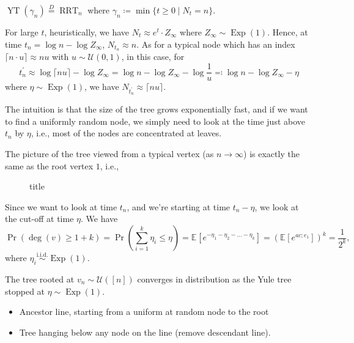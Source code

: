 \begin{lemma}
	\(\operatorname{YT}(\gamma _n) \overset{D}{=} \operatorname{RRT}_n \) where \(\gamma _n \coloneqq \min \{ t \geq 0 \mid N_t = n \} \).
\end{lemma}

For large \(t\), heuristically, we have \(N_t \approx e^t \cdot Z_{\infty } \) where \(Z_{\infty } \sim \operatorname{Exp}(1) \). Hence, at time \(t_n = \log n - \log Z_{\infty }\), \(N_{t_n} \approx n\). As for a typical node which has an index \(\lceil n \cdot u \rceil \approx n u\) with \(u \sim \mathcal{U} (0, 1)\), in this case, for
\[
	t^{\prime} _n
	\approx \log \lceil n u \rceil - \log Z_{\infty }
	= \log n - \log Z_\infty - \log \frac{1}{u}
	\eqqcolon \log n - \log Z_\infty - \eta
\]
where \(\eta \sim \operatorname{Exp}(1) \), we have \(N_{t^{\prime} _n} \approx \lceil n u \rceil \).

\begin{intuition}
	The intuition is that the size of the tree grows exponentially fast, and if we want to find a uniformly random node, we simply need to look at the time just above \(t_n\) by \(\eta \), i.e., most of the nodes are concentrated at leaves.
\end{intuition}

The picture of the tree viewed from a typical vertex (as \(n \to \infty \)) is exactly the same as the root vertex \(1\), i.e.,
\begin{figure}[H]
	\centering
	\caption{title}
	\label{fig:CTBP-typical-vertex}
\end{figure}

Since we want to look at time \(t_n\), and we're starting at time \(t_n - \eta \), we look at the cut-off at time \(\eta \). We have
\[
	\Pr_{}\left(\deg (v) \geq 1 + k\right)
	= \Pr_{}\left(\sum_{i=1}^{k} \eta _i \leq \eta \right)
	= \mathbb{E}_{}[e^{- \eta _1 - \eta _2 - \dots - \eta _k}]
	= \left( \mathbb{E}_{}[e^{ac;e_1} ] \right) ^k
	= \frac{1}{2^k},
\]
where \(\eta _i \overset{\text{i.i.d.} }{\sim } \operatorname{Exp}(1) \).

\begin{theorem}
	The tree rooted at \(v_n \sim \mathcal{U} ([n])\) converges in distribution as the Yule tree stopped at \(\eta \sim \operatorname{Exp}(1) \).
\end{theorem}

\begin{figure}[H]
	\centering
	\caption{}
	\label{fig:CTBP-ancestor}
\end{figure}

\begin{itemize}
	\item Ancestor line, starting from a uniform at random node to the root
	\item Tree hanging below any node on the line (remove descendant line).
\end{itemize}